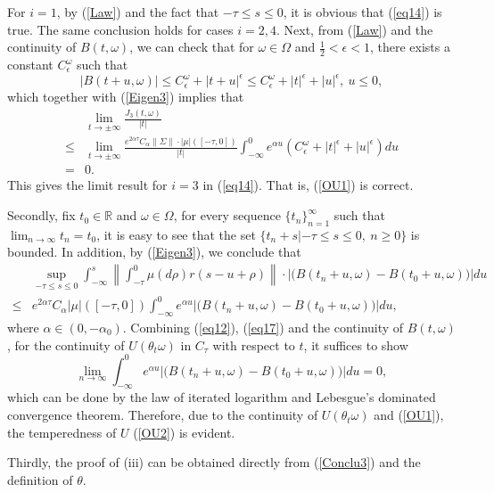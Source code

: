 \documentclass[preprint,12pt]{elsarticle}
\begin{document}
For $i=1$, by (\ref{Law}) and the fact that $-\tau\leq s\leq0$, it is obvious that (\ref{eq14}) is true. The same conclusion holds for cases $i=2,4$.
Next, from (\ref{Law}) and the continuity of $B(t,\omega)$, we can check that for $\omega\in\Omega$ and $\frac12<\epsilon<1$, there exists a constant $C_\epsilon^\omega$ such that
\begin{equation}\label{eq15}
|B(t+u,\omega)|\leq C_\epsilon^\omega+|t+u|^\epsilon\leq C_\epsilon^\omega+|t|^\epsilon+|u|^\epsilon,\ u\leq0,
\end{equation}
which together with (\ref{Eigen3}) implies that
\begin{align}\label{eq16}
&\lim_{t\rightarrow\pm\infty}\frac{J_3(t,\omega)}{|t|}\nonumber\\
\leq&\lim_{t\rightarrow\pm\infty}\frac{e^{2\alpha\tau}C_\alpha\|\Sigma\|\cdot|\mu|([-\tau,0])}{|t|}\int_{-\infty}^{0}e^{\alpha u}(C_\epsilon^\omega+|t|^\epsilon+|u|^\epsilon)du\nonumber\\
=&0.
\end{align}
This gives the limit result for $i=3$ in (\ref{eq14}). That is, (\ref{OU1}) is correct.

Secondly, fix $t_0\in\mathbb{R}$ and $\omega\in\Omega$, for every sequence $\{t_n\}_{n=1}^\infty$
such that $\lim_{n\rightarrow\infty}t_n=t_0$, it is easy to see that the set $\{t_n+s|-\tau\leq s\leq0,\ n\geq0\}$ is bounded. In addition, by (\ref{Eigen3}), we conclude that
\begin{align}\label{eq17}
&\sup_{-\tau\leq s\leq0}\int_{-\infty}^{s}\left\|\int_{-\tau}^0\mu(d\rho)r(s-u+\rho)\right\|\cdot\left|\bigl(B(t_n+u,\omega)-B(t_0+u,\omega)\bigr)\right|du\nonumber\\
\leq&e^{2\alpha\tau}C_\alpha|\mu|([-\tau,0])\int_{-\infty}^{0}e^{\alpha u}\left|\bigl(B(t_n+u,\omega)-B(t_0+u,\omega)\bigr)\right|du,
\end{align}
where $\alpha\in(0,-\alpha_0)$. Combining (\ref{eq12}), (\ref{eq17}) and the continuity of $B(t,\omega)$, for the continuity of $U(\theta_t\omega)$ in $C_\tau$ with respect to $t$, it suffices to show
\[
\lim_{n\rightarrow\infty}\int_{-\infty}^{0}e^{\alpha u}\left|\bigl(B(t_n+u,\omega)-B(t_0+u,\omega)\bigr)\right|du=0,
\]
which can be done by the law of iterated logarithm and Lebesgue's dominated convergence theorem. Therefore, due to the continuity of $U(\theta_t\omega)$ and (\ref{OU1}), the temperedness of $U$ (\ref{OU2}) is evident.

Thirdly, the proof of (iii) can be obtained directly from (\ref{Conclu3}) and the definition of $\theta$.
\end{document}

